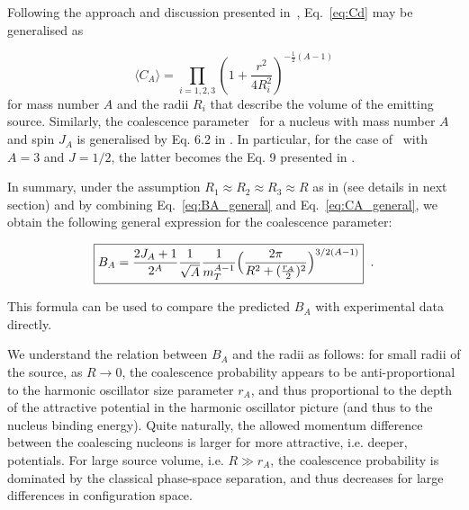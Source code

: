 Following the approach and discussion presented in~\cite{Blum:2017qnn}, Eq.~\ref{eq:Cd} may be generalised as 

\begin{equation}
\langle C_{A} \rangle = \prod_{i=1,2,3} \left(1 + \frac{r^2}{4R_{i}^2} \right)^{-\frac{1}{2}(A-1)}
\label{eq:CA_general}
\end{equation}
%
for mass number $A$ and the radii $R_{i}$ that describe the volume of the emitting source.
Similarly, the coalescence parameter \bA~for a nucleus with mass number $A$ and spin $J_{A}$ is generalised by Eq. 6.2 in \cite{Scheibl:1998tk}.
In particular, for the case of \hethree~with $A=3$ and $J=1/2$, 
the latter becomes the Eq. 9 presented in \cite{Blum:2017qnn}.
% 
%
 
In summary, under the assumption $R_1\approx R_2 \approx R_3 \approx R$ as in \cite{Blum:2017qnn} (see details in next section) and by combining Eq.~\ref{eq:BA_general} and Eq.~\ref{eq:CA_general}, we obtain the following general expression for the coalescence parameter:

\begin{equation}
	\boxed {  B_{A} = {2J_{A} + 1 \over 2^{A}} {1 \over \sqrt{A}} {1 \over m_{T}^{A-1}} \Bigl({2\pi \over R^2 + ({r_A \over 2})^2 }\Bigr)^{3/2(A-1)} } \;\; .
\end{equation}

\noindent This formula can be used to compare the predicted $B_{A}$ with experimental data directly.
 
We understand the relation between $B_A$ and the radii as follows: for small radii of the source, as $R \rightarrow 0$, the coalescence probability appears to be anti-proportional to the harmonic oscillator size parameter $r_A$, and thus proportional to the depth of the attractive potential in the harmonic oscillator picture (and thus to the nucleus binding energy).
Quite naturally, the allowed momentum difference between the coalescing nucleons is larger for more attractive, i.e. deeper, potentials. 
For large source volume, i.e. $R \gg r_A$, the coalescence probability is dominated by the classical phase-space separation, and thus decreases for large differences in configuration space. 

